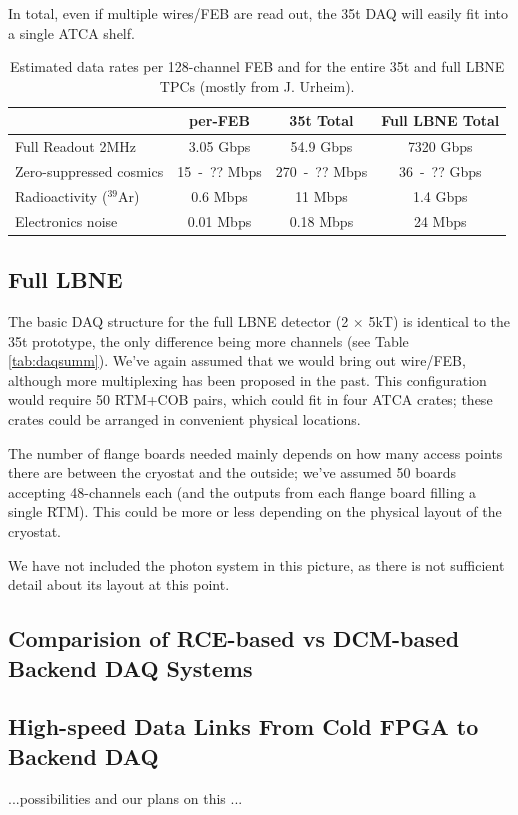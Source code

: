 In total, even if multiple wires/FEB are read out, the 35t DAQ will easily fit into a single ATCA shelf.  


\begin{table}[tbh]
\begin{center}
\begin{tabular}{|l|c|c|c|}   
\hline \hline 
    											&    per-FEB               &       35t   Total   & Full LBNE  Total \\      
\hline
   Full Readout 2MHz  			  & 3.05 Gbps & 54.9 Gbps  &  7320 Gbps \\ 
   Zero-suppressed cosmics  & 15~-~?? Mbps& 270~-~?? Mbps  &  36~-~??  Gbps\\ 
  Radioactivity  ($^{39}$Ar)    & 0.6 Mbps&  11 Mbps  &   1.4 Gbps \\
   Electronics noise& 0.01 Mbps & 0.18 Mbps&  24 Mbps\\ 
\hline \hline
\end{tabular}
\caption[]{Estimated data rates per 128-channel FEB and for the entire 35t and full LBNE TPCs  (mostly from J. Urheim).}
\label{tab:datarates} 
\end{center}
\end{table}

\subsection{Full LBNE}

The basic DAQ structure for the full LBNE detector (2 $\times$ 5kT) is identical to the 35t prototype, the only difference being more channels (see Table \ref{tab:daqsumm}).  We've again assumed that we would bring out wire/FEB, although more multiplexing has been proposed in the past.  This configuration would require 50 RTM+COB pairs, which could fit in four ATCA crates; these crates could be arranged in convenient physical locations.  

The number of flange boards needed mainly depends on how many access points there are between the cryostat and the outside;  we've assumed 50 boards accepting 48-channels each (and the outputs from each flange board filling a single RTM).  This could be more or less depending on the physical layout of the cryostat.  

We have not included the photon system in this picture, as there is not sufficient detail about its layout at this point. 

\subsection{Comparision of RCE-based vs DCM-based Backend DAQ Systems}






\subsection{High-speed Data Links From Cold FPGA to Backend DAQ}

...possibilities and our plans on this ...


